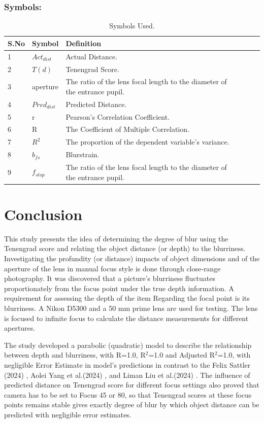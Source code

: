 \documentclass[sn-mathphys]{sn-jnl}%
\theoremstyle{thmstyleone}%
\theoremstyle{thmstyletwo}%
\theoremstyle{thmstylethree}%
\begin{document}
\subsubsection{ Symbols: }
\begin{table}[!htbp]
 \caption{Symbols Used.} \label{tab:am6b}
 
\begin{tabular}
{ l l l l l l}\hline S.No& Symbol& Definition \\
\hline
\hline
1&$Act_{dist}$&Actual Distance. \\
\hline
2&$T{(d)}$&Tenengrad Score.\\
\hline
3&aperture&The ratio of the lens focal length to the diameter of the entrance pupil.\\
\hline
4&$Pred_{dist}$&Predicted Distance.\\
\hline
5&r&Pearson’s Correlation Coefficient.\\
\hline
6&R&The Coefficient of Multiple Correlation.\\
\hline
7&$R^{2}$&The proportion of the dependent variable's variance.\\
\hline
8&$b_{fs}$&Blurstrain.\\
\hline
9&{$f_{stop}$}&The ratio of the lens focal length to the diameter of the entrance pupil.\\
\hline
 \end{tabular}
\end{table}

\pagebreak
\section{Conclusion}
This study presents the idea of determining the degree of blur using the Tenengrad score and relating the object distance (or depth) to the blurriness. Investigating the profundity (or distance) impacts of object dimensions and of the aperture of the lens in manual focus style is done through close-range photography. It was discovered that a picture's blurriness fluctuates proportionately from the focus point under the true depth information. A requirement for assessing the depth of the item Regarding the focal point is its blurriness. A Nikon D5300 and a 50 mm prime lens are used for testing. The lens is focused to infinite focus to calculate the distance measurements for different apertures.\par

The study developed a parabolic (quadratic) model to describe the relationship between depth and blurriness, with R=1.0, R$^{2}$=1.0 and Adjusted R$^{2}$=1.0,  with negligible Error Estimate in model's predictions in contrast to the Felix Sattler (2024) \cite{bib15}, Aolei Yang et al.(2024) \cite{bib14}, and Liman Liu et al.(2024) \cite{bib16}. The influence of predicted distance on Tenengrad score for different focus settings also proved that camera has to be set to Focus 45 or 80, so that Tenengrad scores at these focus points remains stable gives exactly degree of blur by which object distance can be predicted with negligible error estimates. 
\end{document}

